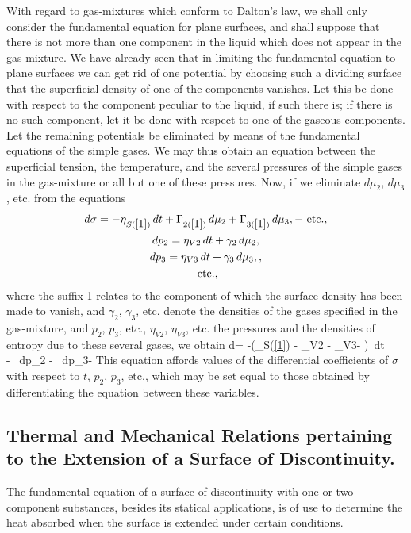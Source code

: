 \documentclass[12pt]{article}
\begin{document}
{With regard to gas-mixtures which conform to Dalton's law, we shall only consider the fundamental equation for plane surfaces, and shall suppose that there is not more than one component in the liquid which does not appear in the gas-mixture. We have already seen that in limiting the fundamental equation to plane surfaces we can get rid of one potential by choosing such a dividing surface that the superficial density of one of the components vanishes. Let this be done with respect to the component peculiar to the liquid, if such there is; if there is no such component, let it be done with respect to one of the gaseous components. Let the remaining potentials be eliminated by means of the fundamental equations of the simple gases. We may thus obtain an equation between the superficial tension, the temperature, and the several pressures of the simple gases in the gas-mixture or all but one of these pressures. Now, if we eliminate $d\mu_2$, $d\mu_3$, etc. from the equations
\begin{gather*}
d\sigma =  -\eta_{S(\ref{1})} \,dt + \Gamma_{2(\ref{1})} \, d\mu_2 +\Gamma_{3(\ref{1})} \, d\mu_3,- \text{ etc.}, \\
dp_2 = \eta_{V2}\, dt+ \gamma_2\, d\mu_2, \\ 
dp_3 = \eta_{V3}\, dt+ \gamma_3\, d\mu_3,, \\
\text{ etc.}, \end{gather*}
where the suffix 1 relates to the component of which the surface density has been made to vanish, and $\gamma_2$, $\gamma_3$, etc. denote the densities of the gases specified in the gas-mixture, and $p_2$, $p_3$, etc., $\eta_{V2}$, $\eta_{V3}$, etc. the pressures and the densities of entropy due to these several gases, we obtain
\eqs d\sigma= -\left(\eta_{S(\ref{1})} - \eta_{V2}  - \eta_{V3}- \right)\, dt \\
- \, dp_2 - \, dp_3-   \label{585} \eqe
This equation affords values of the differential coefficients of $\sigma$ with respect to $t$, $p_2$, $p_3$, etc., which may be set equal to those obtained by differentiating the equation between these variables.
\subsection{Thermal and Mechanical Relations pertaining to the Extension of a Surface of Discontinuity.}
The fundamental equation of a surface of discontinuity with one or two component substances, besides its statical applications, is of use to determine the heat absorbed when the surface is extended under certain conditions.


}
\end{document}
